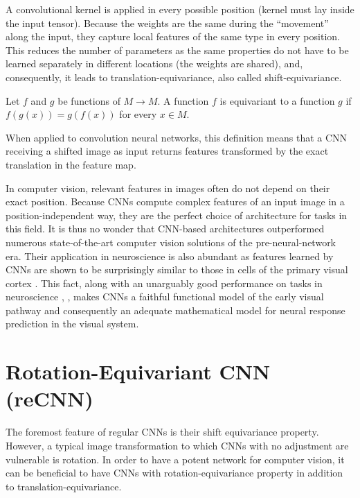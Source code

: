 A convolutional kernel is applied in every possible position (kernel must lay inside the input tensor). Because the weights are the same during the “movement” along the input, they capture local features of the same type in every position. This reduces the number of parameters as the same properties do not have to be learned separately in different locations (the weights are shared), and, consequently, it leads to translation-equivariance, also called shift-equivariance.


\begin{defn}[Equivariance]\label{def01:8}
	Let $f$ and $g$ be functions of $M \to M$. A function $f$ is equivariant to a function $g$ if $f(g(x)) = g(f(x))$ for every $x \in M$.
\end{defn}

When applied to convolution neural networks, this definition means that a CNN receiving a shifted image as input returns features transformed by the exact translation in the feature map.

In computer vision, relevant features in images often do not depend on their exact position. Because CNNs compute complex features of an input image in a position-independent way, they are the perfect choice of architecture for tasks in this field. It is thus no wonder that CNN-based architectures outperformed numerous state-of-the-art computer vision solutions of the pre-neural-network era. Their application in neuroscience is also abundant as features learned by CNNs are shown to be surprisingly similar to those in cells of the primary visual cortex \citep{kriegeskorte2015deep}. This fact, along with an unarguably good performance on tasks in neuroscience \citep{cadena2019deep}, \citep{klindt2017neural}, makes CNNs a faithful functional model of the early visual pathway and consequently an adequate mathematical model for neural response prediction in the visual system.

\section{Rotation-Equivariant CNN (reCNN)}


The foremost feature of regular CNNs is their shift equivariance property. However, a typical image transformation to which CNNs with no adjustment are vulnerable is rotation. In order to have a potent network for computer vision, it can be beneficial to have CNNs with rotation-equivariance property in addition to translation-equivariance.

